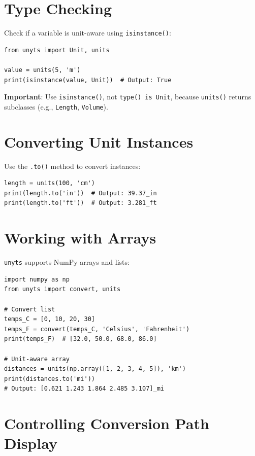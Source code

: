 \documentclass[11pt,a4paper]{report}
\begin{document}
\section{Type Checking}

Check if a variable is unit-aware using \texttt{isinstance()}:

\begin{lstlisting}[style=pythonstyle]
from unyts import Unit, units

value = units(5, 'm')
print(isinstance(value, Unit))  # Output: True
\end{lstlisting}

\textbf{Important}: Use \texttt{isinstance()}, not \texttt{type() is Unit}, because \texttt{units()} returns subclasses (e.g., \texttt{Length}, \texttt{Volume}).

\section{Converting Unit Instances}

Use the \texttt{.to()} method to convert instances:

\begin{lstlisting}[style=pythonstyle]
length = units(100, 'cm')
print(length.to('in'))  # Output: 39.37_in
print(length.to('ft'))  # Output: 3.281_ft
\end{lstlisting}

\section{Working with Arrays}

\texttt{unyts} supports NumPy arrays and lists:

\begin{lstlisting}[style=pythonstyle]
import numpy as np
from unyts import convert, units

# Convert list
temps_C = [0, 10, 20, 30]
temps_F = convert(temps_C, 'Celsius', 'Fahrenheit')
print(temps_F)  # [32.0, 50.0, 68.0, 86.0]

# Unit-aware array
distances = units(np.array([1, 2, 3, 4, 5]), 'km')
print(distances.to('mi'))  
# Output: [0.621 1.243 1.864 2.485 3.107]_mi
\end{lstlisting}

\section{Controlling Conversion Path Display}
\end{document}
